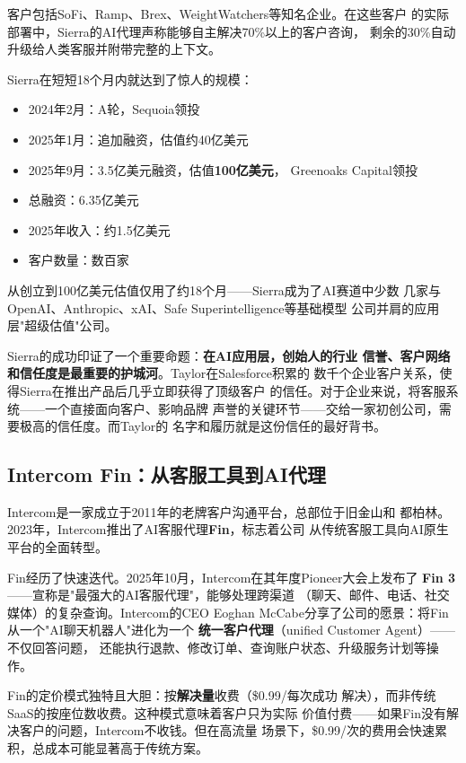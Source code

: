 客户包括SoFi、Ramp、Brex、WeightWatchers等知名企业。在这些客户
的实际部署中，Sierra的AI代理声称能够自主解决70\%以上的客户咨询，
剩余的30\%自动升级给人类客服并附带完整的上下文。

Sierra在短短18个月内就达到了惊人的规模：

\begin{itemize}
  \item 2024年2月：A轮，Sequoia领投
  \item 2025年1月：追加融资，估值约40亿美元
  \item 2025年9月：3.5亿美元融资，估值\textbf{100亿美元}，
    Greenoaks Capital领投
  \item 总融资：6.35亿美元
  \item 2025年收入：约1.5亿美元
  \item 客户数量：数百家
\end{itemize}

从创立到100亿美元估值仅用了约18个月——Sierra成为了AI赛道中少数
几家与OpenAI、Anthropic、xAI、Safe Superintelligence等基础模型
公司并肩的应用层"超级估值"公司。

Sierra的成功印证了一个重要命题：\textbf{在AI应用层，创始人的行业
信誉、客户网络和信任度是最重要的护城河}。Taylor在Salesforce积累的
数千个企业客户关系，使得Sierra在推出产品后几乎立即获得了顶级客户
的信任。对于企业来说，将客服系统——一个直接面向客户、影响品牌
声誉的关键环节——交给一家初创公司，需要极高的信任度。而Taylor的
名字和履历就是这份信任的最好背书。

\subsection{Intercom Fin：从客服工具到AI代理}
\label{subsec:intercom-fin}

Intercom是一家成立于2011年的老牌客户沟通平台，总部位于旧金山和
都柏林。2023年，Intercom推出了AI客服代理\textbf{Fin}，标志着公司
从传统客服工具向AI原生平台的全面转型。

Fin经历了快速迭代。2025年10月，Intercom在其年度Pioneer大会上发布了
\textbf{Fin 3}——宣称是"最强大的AI客服代理"，能够处理跨渠道
（聊天、邮件、电话、社交媒体）的复杂查询。Intercom的CEO Eoghan
McCabe分享了公司的愿景：将Fin从一个"AI聊天机器人"进化为一个
\textbf{统一客户代理}（unified Customer Agent）——不仅回答问题，
还能执行退款、修改订单、查询账户状态、升级服务计划等操作。

Fin的定价模式独特且大胆：按\textbf{解决量}收费（\$0.99/每次成功
解决），而非传统SaaS的按座位数收费。这种模式意味着客户只为实际
价值付费——如果Fin没有解决客户的问题，Intercom不收钱。但在高流量
场景下，\$0.99/次的费用会快速累积，总成本可能显著高于传统方案。

